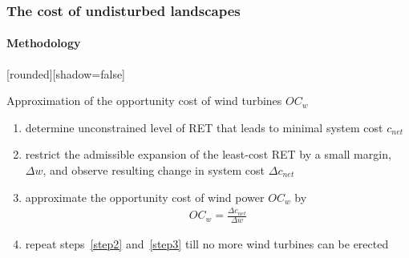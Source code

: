 \documentclass[aspectratio=1610, xcolor=dvipsnames]{beamer}
\begin{document}
    \begin{frame}
        \frametitle{The cost of undisturbed landscapes}
        \framesubtitle{Methodology}

        \medskip
        {%
            [rounded][shadow=false]
            \begin{block}{Approximation of the opportunity cost of wind turbines $OC_w$}
                \medskip
                \begin{enumerate}
                    \item determine unconstrained level of RET that leads to minimal system cost $c_{net}$ \label{step1}
                    \item restrict the admissible expansion of the least-cost RET by a small margin, $\Delta w$, and observe
                    resulting change in system cost $\Delta c_{net}$ \label{step2}
                    \item approximate the opportunity cost of wind power $OC_w$ by \label{step3}
                    \begin{align*}
                        OC_w = \frac{\Delta c_{net}}{\Delta w}
                    \end{align*}
                    \item repeat steps~\ref{step2} and~\ref{step3} till no more wind turbines can be erected
                \end{enumerate}
            \end{block}
        }%
    \end{frame}
\end{document}
